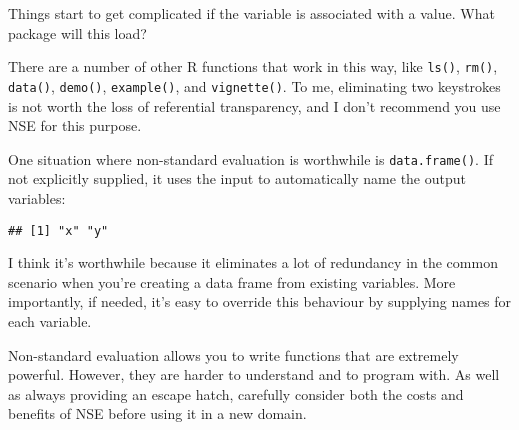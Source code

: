 \begin{Shaded}
\begin{Highlighting}[]
\NormalTok{(}\NormalTok{)}
\end{Highlighting}
\end{Shaded}

Things start to get complicated if the variable is associated with a
value. What package will this load?

\begin{Shaded}
\begin{Highlighting}[]
\end{Highlighting}
\end{Shaded}

There are a number of other R functions that work in this way, like
\texttt{ls()}, \texttt{rm()}, \texttt{data()}, \texttt{demo()},
\texttt{example()}, and \texttt{vignette()}. To me, eliminating two
keystrokes is not worth the loss of referential transparency, and I
don't recommend you use NSE for this purpose.

One situation where non-standard evaluation is worthwhile is
\texttt{data.frame()}. If not explicitly supplied, it uses the input to
automatically name the output variables:

\begin{Shaded}
\begin{Highlighting}[]
\StringTok{ }
\StringTok{ }
\end{Highlighting}
\end{Shaded}

\begin{verbatim}
## [1] "x" "y"
\end{verbatim}

I think it's worthwhile because it eliminates a lot of redundancy in the
common scenario when you're creating a data frame from existing
variables. More importantly, if needed, it's easy to override this
behaviour by supplying names for each variable.

Non-standard evaluation allows you to write functions that are extremely
powerful. However, they are harder to understand and to program with. As
well as always providing an escape hatch, carefully consider both the
costs and benefits of NSE before using it in a new domain.

